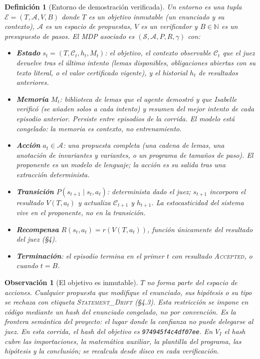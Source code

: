 \documentclass[11pt,a4paper]{article}
\newtheorem{definition}{Definición}
\newtheorem{remark}{Observación}
\begin{document}
\begin{definition}[Entorno de demostración verificada]
Un entorno es una tupla $\mathcal{E} = (T, \mathcal{A}, V, B)$ donde $T$ es un \emph{objetivo} inmutable (un enunciado y su contexto), $\mathcal{A}$ es un espacio de \emph{propuestas}, $V$ es un \emph{verificador} y $B \in \mathbb{N}$ es un presupuesto de pasos. El MDP asociado es $(\mathcal{S}, \mathcal{A}, P, R, \gamma)$ con:
\begin{itemize}
  \item \textbf{Estado} $s_t = (T, \mathcal{C}_t, h_t, M_t)$: el objetivo, el \emph{contexto observable} $\mathcal{C}_t$ que el juez devuelve tras el último intento (lemas disponibles, obligaciones abiertas con su texto literal, o el valor certificado vigente), y el historial $h_t$ de resultados anteriores.
  \item \textbf{Memoria} $M_t$: biblioteca de lemas que el agente demostró y que Isabelle verificó (se añaden solos a cada intento) y resumen del mejor intento de cada episodio anterior. Persiste entre episodios de la corrida. El modelo está congelado: la memoria es contexto, no entrenamiento.
  \item \textbf{Acción} $a_t \in \mathcal{A}$: una propuesta completa (una cadena de lemas, una anotación de invariantes y variantes, o un programa de tamaños de paso). El proponente es un modelo de lenguaje; la acción es su salida tras una extracción determinista.
  \item \textbf{Transición} $P(s_{t+1} \mid s_t, a_t)$: determinista dado el juez; $s_{t+1}$ incorpora el resultado $V(T, a_t)$ y actualiza $\mathcal{C}_{t+1}$ y $h_{t+1}$. La estocasticidad del sistema vive en el proponente, no en la transición.
  \item \textbf{Recompensa} $R(s_t, a_t) = r(V(T, a_t))$, función únicamente del resultado del juez (§4).
  \item \textbf{Terminación}: el episodio termina en el primer $t$ con resultado \textsc{Accepted}, o cuando $t = B$.
\end{itemize}
\end{definition}

\begin{remark}[El objetivo es inmutable]
$T$ no forma parte del espacio de acciones. Cualquier propuesta que modifique el enunciado, sus hipótesis o su tipo se rechaza con etiqueta \textsc{Statement\_Drift} (§4.3). Esta restricción se impone en código mediante un hash del enunciado congelado, no por convención. Es la \emph{frontera semántica} del proyecto: el lugar donde la confianza no puede delegarse al juez.
En esta corrida, el hash del objetivo es \texttt{974945f4c4df07ee}. En $V_I$ el hash cubre las importaciones, la matemática auxiliar, la plantilla del programa, las hipótesis y la conclusión; se recalcula desde disco en cada verificación.
\end{remark}
\end{document}
